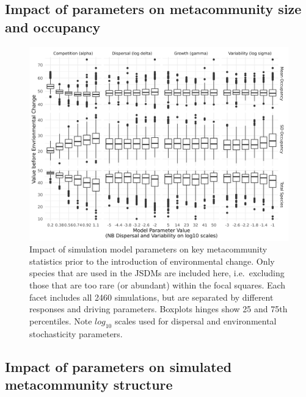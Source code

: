 \documentclass[
]{article}
\begin{document}
\hypertarget{impact-of-parameters-on-metacommunity-size-and-occupancy}{%
\subsection{Impact of parameters on metacommunity size and
occupancy}\label{impact-of-parameters-on-metacommunity-size-and-occupancy}}

\begin{figure}
\centering
\includegraphics{SimulationMarkdowns/Figures/OccuBefore.png}
\caption{Impact of simulation model parameters on key metacommunity
statistics prior to the introduction of environmental change. Only
species that are used in the JSDMs are included here, i.e.~excluding
those that are too rare (or abundant) within the focal squares. Each
facet includes all 2460 simulations, but are separated by different
responses and driving parameters. Boxplots hinges show 25 and 75th
percentiles. Note \(log_{10}\) scales used for dispersal and
environmental stochasticity parameters.}
\end{figure}

\hypertarget{impact-of-parameters-on-simulated-metacommunity-structure}{%
\subsection{Impact of parameters on simulated metacommunity
structure}\label{impact-of-parameters-on-simulated-metacommunity-structure}}
\end{document}
